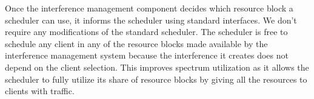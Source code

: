 Once the interference management component decides which resource block a scheduler can use, it informs the scheduler using standard interfaces. We don't require any modifications of the standard scheduler. The scheduler is free to schedule any client in any of the resource blocks made available by the interference management system because the interference it creates does not depend on the client selection. This improves spectrum utilization as it allows the scheduler to fully utilize its share of resource blocks by giving all the resources to clients with traffic. 












